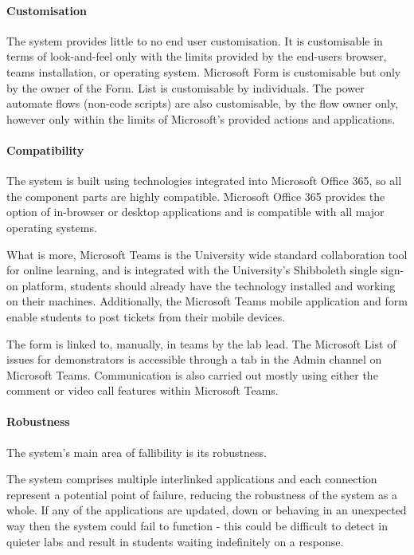 \paragraph{Customisation} 

The system provides little to no end user customisation. It is customisable in terms of look-and-feel only with the limits provided by the end-users browser, teams installation, or operating system. Microsoft Form is customisable but only by the owner of the Form. List is customisable by individuals. The power automate \cite{pauto} flows (non-code scripts) are also customisable, by the flow owner only, however only within the limits of Microsoft's provided actions and applications.

\paragraph{Compatibility}  

The system is built using technologies integrated into Microsoft Office 365, so all the component parts are highly compatible. Microsoft Office 365 provides the option of in-browser or desktop applications and is compatible with all major operating systems.

What is more, Microsoft Teams is the University wide standard collaboration tool for online learning, and is integrated with the University's Shibboleth \cite{shibboleth} single sign-on platform, students should already have the technology installed and working on their machines. Additionally, the Microsoft Teams mobile application and form enable students to post tickets from their mobile devices.

The form is linked to, manually, in teams by the lab lead. The Microsoft List of issues for demonstrators is accessible through a tab in the Admin channel on Microsoft Teams. Communication is also carried out mostly using either the comment or video call features within Microsoft Teams.  

\paragraph{Robustness}
The system's main area of fallibility is its robustness. 

The system comprises multiple interlinked applications and each connection represent a potential point of failure, reducing the robustness of the system as a whole. If any of the applications are updated, down or behaving in an unexpected way then the system could fail to function - this could be difficult to detect in quieter labs and result in students waiting indefinitely on a response.


